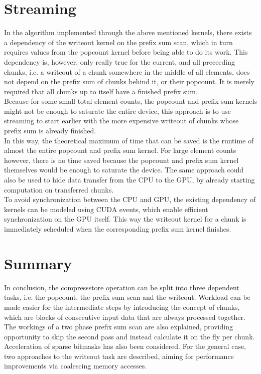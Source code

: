 \documentclass{tudscrreprt}
\begin{document}
		\section{Streaming}
			In the algorithm implemented through the above mentioned kernels, there exists a dependency of the writeout kernel on the prefix sum scan, which in turn requires values from the popcount kernel before being able to do its work. This dependency is, however, only really true for the current, and all preceeding chunks, i.e. a writeout of a chunk somewhere in the middle of all elements, does not depend on the prefix sum of chunks behind it, or their popcount. It is merely required that all chunks up to itself have a finished prefix sum. \\
			Because for some small total element counts, the popcount and prefix sum kernels might not be enough to saturate the entire device, this approach is to use streaming to start earlier with the more expensive writeout of chunks whose prefix sum is already finished. \\
			In this way, the theoretical maximum of time that can be saved is the runtime of almost the entire popcount and prefix sum kernel. For large element counts however, there is no time saved because the popcount and prefix sum kernel themselves would be enough to saturate the device. The same approach could also be used to hide data transfer from the CPU to the GPU, by already starting computation on transferred chunks. \\
			
			To avoid synchronization between the CPU and GPU, the existing dependency of kernels can be modeled using CUDA events, which enable efficient synchronization on the GPU itself. This way the writeout kernel for a chunk is immediately scheduled when the corresponding prefix sum kernel finishes. \\
		
		\section{Summary}
			In conclusion, the compressstore operation can be split into three dependent tasks, i.e. the popcount, the prefix sum scan and the writeout. Workload can be made easier for the intermediate steps by introducing the concept of chunks, which are blocks of consecutive input data that are always processed together. \\
			The workings of a two phase prefix sum scan are also explained, providing opportunity to skip the second pass and instead calculate it on the fly per chunk. \\
			Acceleration of sparse bitmasks has also been considered. For the general case, two approaches to the writeout task are described, aiming for performance improvements via coalescing memory accesses. \\
		
\end{document}
